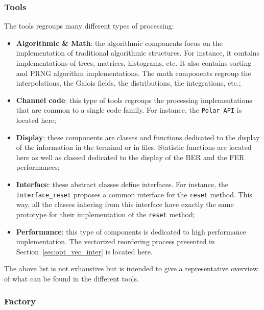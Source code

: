 \subsubsection{Tools}

The tools regroups many different types of processing:
\begin{itemize}
  \item \textbf{Algorithmic \& Math}: the algorithmic components focus on the
    implementation of traditional algorithmic structures. For instance, it
    contains implementations of trees, matrices, histograms, etc. It also
    contains sorting and PRNG algorithm implementations. The math components
    regroup the interpolations, the Galois fields, the distributions, the
    integrations, etc.;
  \item \textbf{Channel code}: this type of tools regroups the processing
    implementations that are common to a single code family. For instance, the
    \verb|Polar_API| is located here;
  \item \textbf{Display}: these components are classes and functions dedicated
    to the display of the information in the terminal or in files. Statistic
    functions are located here as well as classed dedicated to the display of
    the BER and the FER performances;
  \item \textbf{Interface}: these abstract classes define interfaces. For
    instance, the \verb|Interface_reset| proposes a common interface for the
    \verb|reset| method. This way, all the classes inhering from this interface
    have exactly the same prototype for their implementation of the \verb|reset|
    method;
  \item \textbf{Performance}: this type of components is dedicated to high
    performance implementation. The vectorized reordering process presented in
    Section~\ref{sec:opt_vec_inter} is located here.
\end{itemize}
The above list is not exhaustive but is intended to give a representative
overview of what can be found in the different tools.

\subsubsection{Factory}

